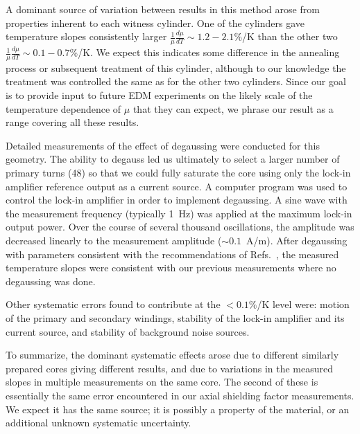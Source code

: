 A dominant source of variation between results in this method arose
from properties inherent to each witness cylinder.  One of the
cylinders gave temperature slopes consistently larger
$\frac{1}{\mu}\frac{d\mu}{dT}\sim 1.2-2.1$\%/K than the other two
$\frac{1}{\mu}\frac{d\mu}{dT}\sim 0.1-0.7$\%/K.  We expect this
indicates some difference in the annealing process or subsequent
treatment of this cylinder, although to our knowledge the treatment
was controlled the same as for the other two cylinders.  Since our
goal is to provide input to future EDM experiments on the likely scale
of the temperature dependence of $\mu$ that they can expect, we phrase
our result as a range covering all these results.

Detailed measurements of the effect of degaussing were conducted for
this geometry.  The ability to degauss led us ultimately to select a
larger number of primary turns (48) so that we could fully saturate
the core using only the lock-in amplifier reference output as a
current source.  A computer program was used to control the lock-in
amplifier in order to implement degaussing.  A sine wave with the
measurement frequency (typically 1~Hz) was applied at the maximum
lock-in output power.  Over the course of several thousand
oscillations, the amplitude was decreased linearly to the measurement
amplitude ($\sim 0.1$~A/m).  After degaussing with parameters
consistent with the recommendations of
Refs.~\cite{bib:thiel,bib:altarev2015}, the measured temperature
slopes were consistent with our previous measurements where no
degaussing was done.

Other systematic errors found to contribute at the $<0.1\%$/K level
were: motion of the primary and secondary windings, stability of the
lock-in amplifier and its current source, and stability of background
noise sources.

To summarize, the dominant systematic effects arose due to different
similarly prepared cores giving different results, and due to
variations in the measured slopes in multiple measurements on the same
core.  The second of these is essentially the same error encountered
in our axial shielding factor measurements.  We expect it has the same
source; it is possibly a property of the material, or an additional
unknown systematic uncertainty.
